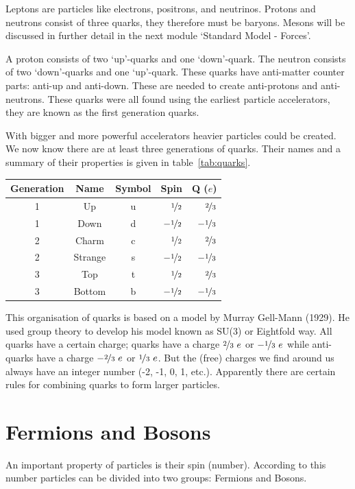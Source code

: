 \documentclass[12pt,a4paper]{article}
\numberwithin{equation}{section}
\numberwithin{figure}{section}
\numberwithin{table}{section}
\begin{document}
Leptons are particles like electrons, positrons, and neutrinos. Protons and neutrons consist of three quarks, they therefore must be baryons. Mesons will be discussed in further detail in the next module `Standard Model - Forces'.

A proton consists of two `up'-quarks and one `down'-quark. The neutron consists of two `down'-quarks and one `up'-quark. These quarks have anti-matter counter parts: anti-up and anti-down. These are needed to create anti-protons and anti-neutrons. These quarks were all found using the earliest particle accelerators, they are known as the first generation quarks. 

With bigger and more powerful accelerators heavier particles could be created. We now know there are at least three generations of quarks. Their names and a summary of their properties is given in table~\ref{tab:quarks}.

\begin{center}\begin{tabular}[h]{c c c r r} 
Generation & Name & Symbol & Spin & Q ($e$) \\ \hline
1 & Up & u & $\nicefrac{1}{2}$ & $\nicefrac{2}{3}$ \\
1 & Down & d & $-\nicefrac{1}{2}$ & $-\nicefrac{1}{3}$ \\
2 & Charm & c & $\nicefrac{1}{2}$ & $\nicefrac{2}{3}$ \\
2 & Strange & s & $-\nicefrac{1}{2}$ & $-\nicefrac{1}{3}$ \\
3 & Top & t & $\nicefrac{1}{2}$ & $\nicefrac{2}{3}$ \\
3 & Bottom & b & $-\nicefrac{1}{2}$ & $-\nicefrac{1}{3}$
\end{tabular}
\label{tab:quarks}
\end{center}

This organisation of quarks is based on a model by Murray Gell-Mann (1929). He used group theory to develop his model known as SU(3) or Eightfold way. All quarks have a certain charge; quarks have a charge $\nicefrac{2}{3}~e$ or $-\nicefrac{1}{3}~e$ while anti-quarks have a charge $-\nicefrac{2}{3}~e$ or $\nicefrac{1}{3}~e$. But the (free) charges we find around us always have an integer number (-2, -1, 0, 1, etc.). Apparently there are certain rules for combining quarks to form larger particles.

\section{Fermions and Bosons}
An important property of particles is their spin (number). According to this number particles can be divided into two groups: Fermions and Bosons.
\end{document}
